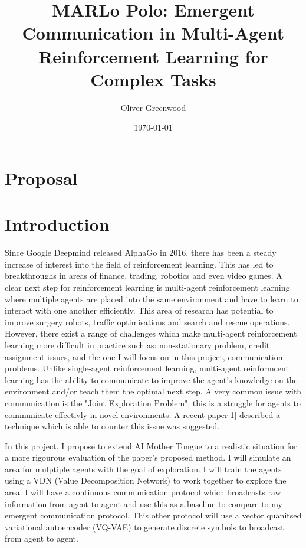 \documentclass[20pt]{article}
\title{MARLo Polo: Emergent Communication in Multi-Agent Reinforcement Learning for Complex Tasks}
\author{Oliver Greenwood}
\date{\today}
\begin{document}
\maketitle

\section*{\fontsize{30}{36}\selectfont Proposal}


\section{Introduction}

\large
Since Google Deepmind released AlphaGo in 2016, there has been a steady increase of interest into the field of reinforcement learning. This has led to breakthroughs in areas of finance, trading, robotics and even video games. A clear next step for reinforcement learning is multi-agent reinforcement learning where multiple agents are placed into the same environment and have to learn to interact with one another efficiently. This area of research has potential to improve surgery robots, traffic optimisations and search and rescue operations. However, there exist a range of challenges which make multi-agent reinforcement learning more difficult in practice such as: non-stationary problem, credit assignment issues, and the one I will focus on in this project, communication problems. Unlike single-agent reinforcement learning, multi-agent reinformcent learning has the ability to communicate to improve the agent's knowledge on the environment and/or teach them the optimal next step. A very common issue with communication is the "Joint Exploration Problem", this is a struggle for agents to communicate effectivly in novel environments. A recent paper[1] described a technique which is able to counter this issue was suggested.

In this project, I propose to extend AI Mother Tongue to a realistic situation for a more rigourous evaluation of the paper's proposed method. I will simulate an area for mulptiple agents with the goal of exploration. I will train the agents using a VDN (Value Decomposition Network) to work together to explore the area. I will have a continuous communication protocol which broadcasts raw information from agent to agent and use this as a baseline to compare to my emergent communication protocol. This other protocol will use a vector quanitsed variational autoencoder (VQ-VAE) to generate discrete symbols to broadcast from agent to agent.
\end{document}
